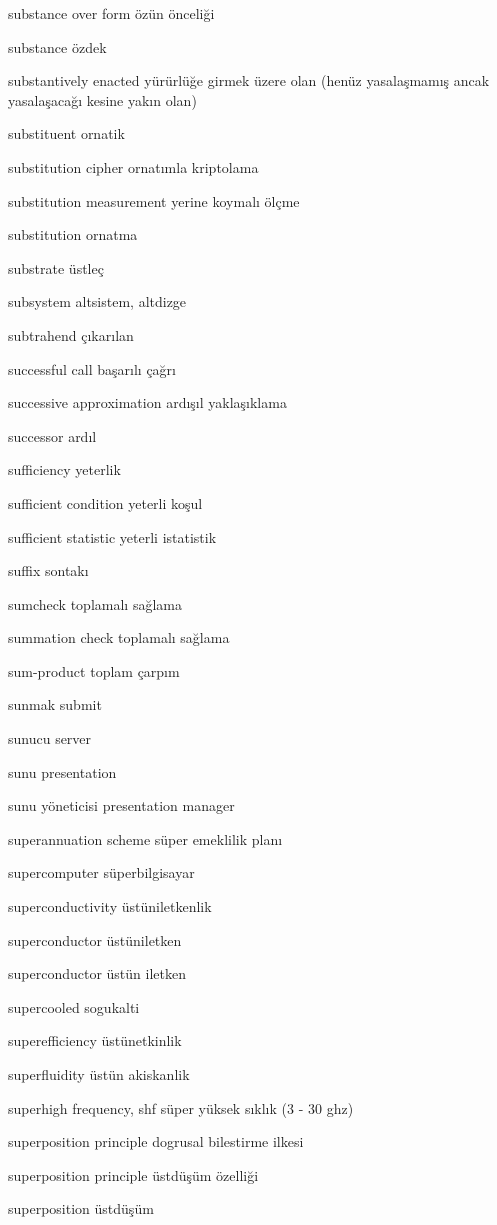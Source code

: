 \documentclass[12pt,fleqn]{article}\usepackage{../../common}
\begin{document}
substance over form özün önceliği

substance özdek

substantively enacted yürürlüğe girmek üzere olan (henüz yasalaşmamış ancak yasalaşacağı kesine yakın olan)

substituent ornatik

substitution cipher ornatımla kriptolama

substitution measurement yerine koymalı ölçme

substitution ornatma

substrate üstleç

subsystem altsistem, altdizge

subtrahend çıkarılan

successful call başarılı çağrı

successive approximation ardışıl yaklaşıklama

successor ardıl

sufficiency yeterlik

sufficient condition yeterli koşul

sufficient statistic yeterli istatistik

suffix sontakı

sumcheck toplamalı sağlama

summation check toplamalı sağlama

sum-product toplam çarpım

sunmak submit

sunucu server

sunu presentation

sunu yöneticisi presentation manager

superannuation scheme süper emeklilik planı

supercomputer süperbilgisayar

superconductivity üstüniletkenlik

superconductor üstüniletken

superconductor üstün iletken

supercooled sogukalti

superefficiency üstünetkinlik

superfluidity üstün akiskanlik

superhigh frequency, shf süper yüksek sıklık (3 - 30 ghz)

superposition principle dogrusal bilestirme ilkesi

superposition principle üstdüşüm özelliği

superposition üstdüşüm
\end{document}
